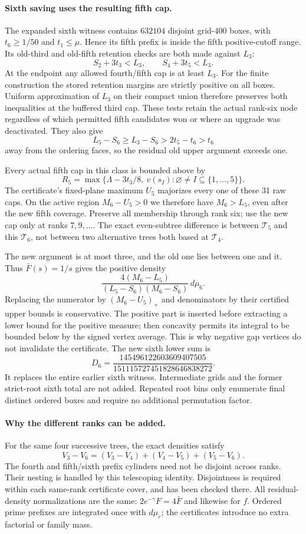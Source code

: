 \paragraph{Sixth saving uses the resulting fifth cap.}
The expanded sixth witness contains $632104$ disjoint grid-$400$
boxes, with $t_6\ge1/50$ and $t_1\le\mu$. Hence its fifth prefix
is inside the fifth positive-cutoff range. Its old-third and
old-fifth retention checks are both made against $L_3$:
\[
 S_2+3t_3<L_3,\qquad S_4+3t_5<L_3.
\]
At the endpoint any allowed fourth/fifth cap is at least $L_3$.
For the finite construction the stored retention margins are
strictly positive on all boxes. Uniform approximation of $L_3$
on their compact union therefore preserves both inequalities at
the buffered third cap. These tests retain the actual rank-six
node regardless of which permitted fifth candidates won or where
an upgrade was deactivated.
They also give
\[
 L_5-S_6\ge L_3-S_6>2t_5-t_6>t_6
\]
away from the ordering faces, so the residual old upper argument
exceeds one.

Every actual fifth cap in this class is bounded above by
\[
 R_5=\max\{\Lambda-3t_3/8,\ v(s_I):
                 \varnothing\ne I\subseteq\{1,\ldots,5\}\}.
\]
The certificate's fixed-plane maximum $U_5$ majorizes every one
of these 31 raw caps. On the active region $M_6-U_5>0$ we therefore
have $M_6>L_5$, even after the new fifth coverage. Preserve all
membership through rank six; use the new cap only at ranks
$7,9,\ldots$. The exact even-subtree difference is between
$\mathcal T_5$ and this $\mathcal T_6$, not between two alternative
trees both based at $\mathcal T_4$.

The new argument is at most three, and the old one lies between
one and it. Thus $\bar F(s)=1/s$ gives the positive density
\[
 \frac{4(M_6-L_5)}{(L_5-S_6)(M_6-S_6)}\,d\mu_6.
\]
Replacing the numerator by $(M_6-U_5)_+$ and denominators by their
certified upper bounds is conservative. The positive part is
inserted before extracting a lower bound for the positive measure;
then concavity permits its integral to be bounded below by the
signed vertex average. This is why negative gap vertices do not
invalidate the certificate. The new sixth lower sum is
\[
 D_6=\frac{145496122603609407505}{151115727451828646838272}.
\]
It replaces the entire earlier sixth witness. Intermediate grids
and the former strict-root sixth total are not added. Repeated
root bins only enumerate final distinct ordered boxes and require
no additional permutation factor.

\paragraph{Why the different ranks can be added.}
For the same four successive trees, the exact densities satisfy
\[
 V_3-V_6=(V_3-V_4)+(V_4-V_5)+(V_5-V_6).
\]
The fourth and fifth/sixth prefix cylinders need not be disjoint
across ranks. Their nesting is handled by this telescoping identity.
Disjointness is required within each same-rank certificate cover,
and has been checked there. All residual-density normalizations
are the same: $2e^{-\gamma}F=4\bar F$ and likewise for $f$.
Ordered prime prefixes are integrated once with $d\mu_r$;
the certificates introduce no extra factorial or family mass.

